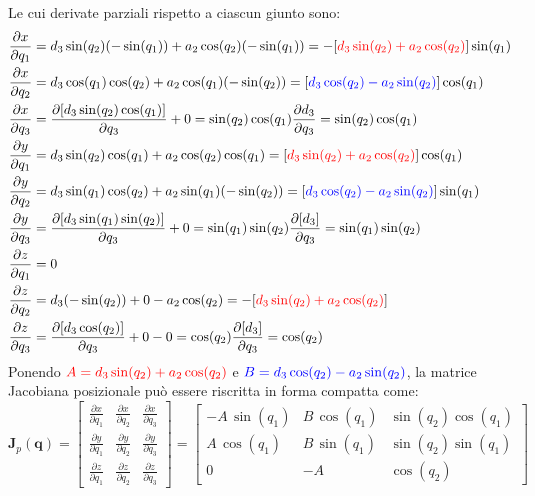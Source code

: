﻿\documentclass[11pt, a4paper]{article}
\begin{document}
Le cui derivate parziali rispetto a ciascun giunto sono:
\begin{align*}
    \frac{\partial x}{\partial q_1} &= d_{3}\sin(q_{2})(-\sin(q_{1})) + a_2\cos(q_{2})(-\sin(q_{1})) = -[\textcolor{red}{d_{3}\sin(q_{2}) + a_{2}\cos(q_{2})}]\sin(q_{1})\\
    \frac{\partial x}{\partial q_2} &= d_{3}\cos(q_{1})\cos(q_{2}) + a_{2}\cos(q_{1})(-\sin(q_{2})) = [\textcolor{blue}{d_{3}\cos(q_{2}) - a_{2}\sin(q_{2})}]\cos(q_{1}) \\
    \frac{\partial x}{\partial q_3} &= \frac{\partial [d_{3}\sin(q_{2})\cos(q_{1})]}{\partial q_3} + 0 = \sin(q_{2})\cos(q_{1}) \frac{\partial d_{3}}{\partial q_3} = \sin(q_{2})\cos(q_{1})\\
    \frac{\partial y}{\partial q_1} &= d_{3}\sin(q_{2})\cos(q_{1}) + a_{2}\cos(q_{2})\cos(q_{1}) = [\textcolor{red}{d_{3}\sin(q_{2}) + a_{2}\cos(q_{2})}]\cos(q_{1}) \\
    \frac{\partial y}{\partial q_2} &= d_3 \sin(q_1) \cos(q_2) + a_2 \sin(q_1) (-\sin(q_2)) = [\textcolor{blue}{d_{3}\cos(q_{2}) - a_{2}\sin(q_{2})}] \sin(q_1) \\
    \frac{\partial y}{\partial q_3} &= \frac{\partial [d_{3}\sin(q_{1})\sin(q_{2})]}{\partial q_3} + 0 = \sin(q_{1})\sin(q_{2})\frac{\partial [d_{3}]}{\partial q_3} = \sin(q_{1})\sin(q_{2}) \\
    \frac{\partial z}{\partial q_1} &= 0\\
    \frac{\partial z}{\partial q_2} &= d_{3}(-\sin(q_{2})) + 0 - a_{2}\cos(q_{2}) = -[\textcolor{red}{d_{3}\sin(q_{2}) + a_{2}\cos(q_{2})}]\\
    \frac{\partial z}{\partial q_3} &= \frac{\partial [d_{3}\cos(q_{2})]}{\partial q_3} + 0 - 0 = \cos(q_{2})\frac{\partial [d_{3}]}{\partial q_3} = \cos(q_{2}) \\
\end{align*}
Ponendo $\textcolor{red}{A = d_{3}\sin(q_{2}) + a_{2}\cos(q_{2})}$ e $\textcolor{blue}{B = d_{3}\cos(q_{2}) - a_{2}\sin(q_{2})}$, la matrice Jacobiana posizionale può essere riscritta in forma compatta come:
\[
\bm{J}_p(\bm{q}) =
\begin{bmatrix}
    \frac{\partial x}{\partial q_1} & \frac{\partial x}{\partial q_2} & \frac{\partial x}{\partial q_3} \\
    \frac{\partial y}{\partial q_1} & \frac{\partial y}{\partial q_2} & \frac{\partial y}{\partial q_3} \\
    \frac{\partial z}{\partial q_1} & \frac{\partial z}{\partial q_2} & \frac{\partial z}{\partial q_3}
\end{bmatrix} =
\begin{bmatrix}
    -A \, \sin(q_{1}) & B \, \cos(q_{1}) & \sin(q_2) \cos(q_1) \\
    A \, \cos(q_{1}) & B \, \sin(q_{1}) & \sin(q_2) \sin(q_1) \\
    0 & -A & \cos(q_2)
\end{bmatrix}
\]
\end{document}
